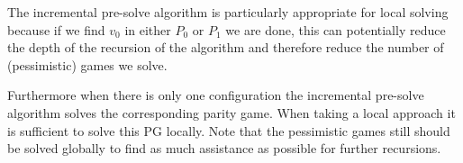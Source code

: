 The incremental pre-solve algorithm is particularly appropriate for local solving because if we find $v_0$ in either $P_0$ or $P_1$ we are done, this can potentially reduce the depth of the recursion of the algorithm and therefore reduce the number of (pessimistic) games we solve.

Furthermore when there is only one configuration the incremental pre-solve algorithm solves the corresponding parity game. When taking a local approach it is sufficient to solve this PG locally. Note that the pessimistic games still should be solved globally to find as much assistance as possible for further recursions.